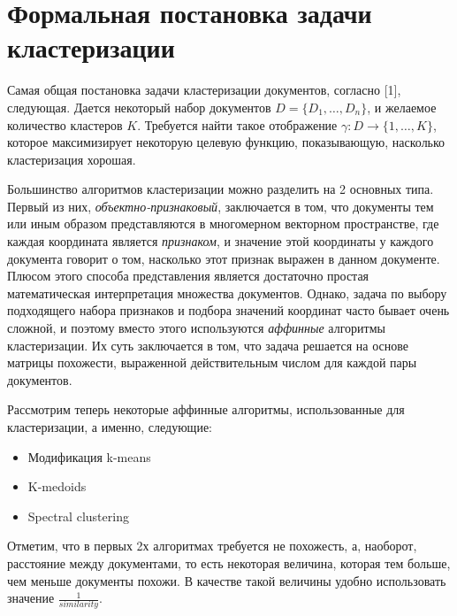 \section{Формальная постановка задачи кластеризации}

Самая общая постановка задачи кластеризации документов, согласно [1], следующая. Дается некоторый набор документов $D = \{D_1, \dots, D_n\}$, и желаемое количество кластеров $K$. Требуется найти такое отображение $\gamma: D \rightarrow \{1, \dots, K\}$, которое максимизирует некоторую целевую функцию, показывающую, насколько кластеризация хорошая.

Большинство алгоритмов кластеризации можно разделить на 2 основных типа. Первый из них, \emph{объектно-признаковый}, заключается в том, что документы тем или иным образом представляются в многомерном векторном пространстве, где каждая координата является \emph{признаком}, и значение этой координаты у каждого документа говорит о том, насколько этот признак выражен в данном документе. Плюсом этого способа представления является достаточно простая математическая интерпретация множества документов. Однако, задача по выбору подходящего набора признаков и подбора значений координат часто бывает очень сложной, и поэтому вместо этого используются \emph{аффинные} алгоритмы кластеризации. Их суть заключается в том, что задача решается на основе матрицы похожести, выраженной действительным числом для каждой пары документов.

Рассмотрим теперь некоторые аффинные алгоритмы, использованные для кластеризации, а именно, следующие:
\begin{itemize}
\item Модификация k-means
\item K-medoids
\item Spectral clustering
\end{itemize}
Отметим, что в первых 2х алгоритмах требуется не похожесть, а, наоборот, расстояние между документами, то есть некоторая величина, которая тем больше, чем меньше документы похожи. В качестве такой величины удобно использовать значение $\frac{1}{similarity}$.